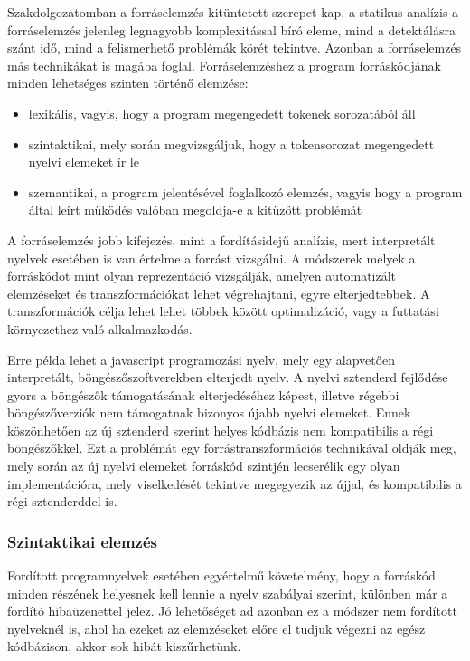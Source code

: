 \documentclass[a4paper,12pt]{report}
\begin{document}
Szakdolgozatomban a forráselemzés kitüntetett szerepet kap, a statikus analízis a forráselemzés jelenleg legnagyobb komplexitással bíró eleme, mind a detektálásra szánt idő, mind a felismerhető problémák körét tekintve. Azonban a forráselemzés más technikákat is magába foglal. Forráselemzéshez a program forráskódjának minden lehetséges szinten történő elemzése:
\begin{itemize}
\item lexikális, vagyis, hogy a program megengedett tokenek sorozatából áll
\item szintaktikai, mely során megvizsgáljuk, hogy a tokensorozat megengedett nyelvi elemeket ír le
\item szemantikai, a program jelentésével foglalkozó elemzés, vagyis hogy a program által leírt működés valóban megoldja-e a kitűzött problémát
\end{itemize}
A forráselemzés jobb kifejezés, mint a fordításidejű analízis, mert interpretált nyelvek esetében is van értelme a forrást vizsgálni. A módszerek melyek a forráskódot mint olyan reprezentáció vizsgálják, amelyen automatizált elemzéseket és transzformációkat \cite{interpretedtransforms} lehet végrehajtani, egyre elterjedtebbek. A transzformációk célja lehet lehet többek között optimalizáció, vagy a futtatási környezethez való alkalmazkodás.

Erre példa lehet a javascript programozási nyelv, mely egy alapvetően interpretált, böngészőszoftverekben elterjedt nyelv. A nyelvi sztenderd fejlődése gyors a böngészők támogatásának elterjedéséhez képest, illetve régebbi böngészőverziók nem támogatnak bizonyos újabb nyelvi elemeket. Ennek köszönhetően az új sztenderd szerint helyes kódbázis nem kompatibilis a régi böngészőkkel. Ezt a problémát egy forrástranszformációs technikával \cite{transpilation} oldják meg, mely során az új nyelvi elemeket forráskód szintjén lecserélik egy olyan implementációra, mely viselkedését tekintve megegyezik az újjal, és kompatibilis a régi sztenderddel is.

\subsubsection{Szintaktikai elemzés}
Fordított programnyelvek esetében egyértelmű követelmény, hogy a forráskód minden részének helyesnek kell lennie a nyelv szabályai szerint, különben már a fordító hibaüzenettel jelez. Jó lehetőséget ad azonban ez a módszer nem fordított nyelveknél is, ahol ha ezeket az elemzéseket előre el tudjuk végezni az egész kódbázison, akkor sok hibát kiszűrhetünk.
\end{document}
